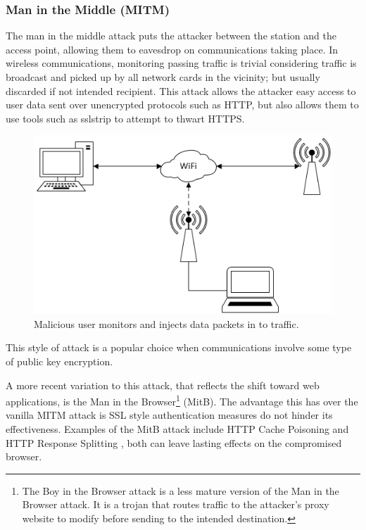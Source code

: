 \subsubsection{Man in the Middle (MITM)}
The man in the middle attack puts the attacker between the station and the access point, allowing them to eavesdrop on communications taking place. In wireless communications, monitoring passing traffic is trivial considering traffic is broadcast and picked up by all network cards in the vicinity; but usually discarded if not intended recipient. This attack allows the attacker easy access to user data sent over unencrypted protocols such as HTTP, but also allows them to use tools such as sslstrip \cite{research:ssl_strip} to attempt to thwart HTTPS.

\begin{figure}[h!]
\includegraphics[width=\linewidth]{research/figures/mitm.png}
\caption{Malicious user monitors and injects data packets in to traffic.}
\end{figure}

This style of attack is a popular choice when communications involve some type of public key encryption. 

A more recent variation to this attack, that reflects the shift toward web applications, is the Man in the Browser\footnote{The Boy in the Browser attack \cite{research:bitb} is a less mature version of the Man in the Browser attack. It is a trojan that routes traffic to the attacker’s proxy website to modify before sending to the intended destination.} (MitB). The advantage this has over the vanilla MITM attack is SSL style authentication measures do not hinder its effectiveness. Examples of the MitB attack include HTTP Cache Poisoning \cite{research:cache_poisoning} and HTTP Response Splitting \cite{research:response_splitting}, both can leave lasting effects on the compromised browser.

